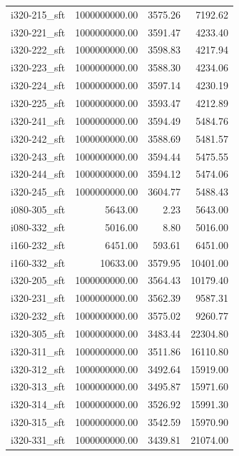 \begin{tabular}{lrrr}
i320-215\_sft & 1000000000.00 &           3575.26 &     7192.62 \\
i320-221\_sft & 1000000000.00 &           3591.47 &     4233.40 \\
i320-222\_sft & 1000000000.00 &           3598.83 &     4217.94 \\
i320-223\_sft & 1000000000.00 &           3588.30 &     4234.06 \\
i320-224\_sft & 1000000000.00 &           3597.14 &     4230.19 \\
i320-225\_sft & 1000000000.00 &           3593.47 &     4212.89 \\
i320-241\_sft & 1000000000.00 &           3594.49 &     5484.76 \\
i320-242\_sft & 1000000000.00 &           3588.69 &     5481.57 \\
i320-243\_sft & 1000000000.00 &           3594.44 &     5475.55 \\
i320-244\_sft & 1000000000.00 &           3594.12 &     5474.06 \\
i320-245\_sft & 1000000000.00 &           3604.77 &     5488.43 \\
i080-305\_sft &       5643.00 &              2.23 &     5643.00 \\
i080-332\_sft &       5016.00 &              8.80 &     5016.00 \\
i160-232\_sft &       6451.00 &            593.61 &     6451.00 \\
i160-332\_sft &      10633.00 &           3579.95 &    10401.00 \\
i320-205\_sft & 1000000000.00 &           3564.43 &    10179.40 \\
i320-231\_sft & 1000000000.00 &           3562.39 &     9587.31 \\
i320-232\_sft & 1000000000.00 &           3575.02 &     9260.77 \\
i320-305\_sft & 1000000000.00 &           3483.44 &    22304.80 \\
i320-311\_sft & 1000000000.00 &           3511.86 &    16110.80 \\
i320-312\_sft & 1000000000.00 &           3492.64 &    15919.00 \\
i320-313\_sft & 1000000000.00 &           3495.87 &    15971.60 \\
i320-314\_sft & 1000000000.00 &           3526.92 &    15991.30 \\
i320-315\_sft & 1000000000.00 &           3542.59 &    15970.90 \\
i320-331\_sft & 1000000000.00 &           3439.81 &    21074.00 \\

\end{tabular}
